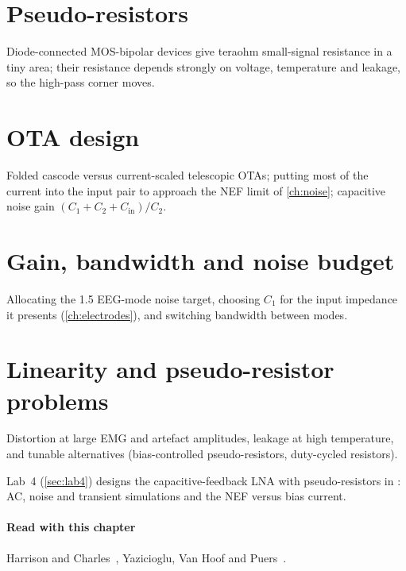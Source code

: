 \section{Pseudo-resistors}\label{sec:ch8-2}
Diode-connected MOS-bipolar devices give teraohm small-signal resistance in a tiny area; their resistance depends strongly on voltage, temperature and leakage, so the high-pass corner moves.

\section{OTA design}\label{sec:ch8-3}
Folded cascode versus current-scaled telescopic OTAs; putting most of the current into the input pair to approach the NEF limit of \cref{ch:noise}; capacitive noise gain $(C_1+C_2+C_\mathrm{in})/C_2$.

\section{Gain, bandwidth and noise budget}\label{sec:ch8-4}
Allocating the \qty{1.5}{\uVrms} EEG-mode noise target, choosing $C_1$ for the input impedance it presents (\cref{ch:electrodes}), and switching bandwidth between modes.

\section{Linearity and pseudo-resistor problems}\label{sec:ch8-5}
Distortion at large EMG and artefact amplitudes, leakage at high temperature, and tunable alternatives (bias-controlled pseudo-resistors, duty-cycled resistors).

\begin{tryit}
Lab~4 (\cref{sec:lab4}) designs the capacitive-feedback LNA with pseudo-resistors in \sgx{}: AC, noise and transient simulations and the NEF versus bias current.
\end{tryit}

\paragraph{Read with this chapter} Harrison and Charles~\cite{harrison2003}, Yazicioglu, Van Hoof and Puers~\cite{yazicioglubook}.
